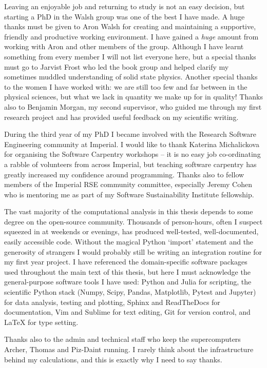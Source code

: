 Leaving an enjoyable job and returning to study is not an easy decision, but starting a PhD in the Walsh group was one of the best I have made. A huge thanks must be given to Aron Walsh for creating and maintaining a supportive, friendly and productive working environment. I have gained a \textit{huge} amount from working with Aron and other members of the group. Although I have learnt something from every member I will not list everyone here, but a special thanks must go to Jarvist Frost who led the book group and helped clarify my sometimes muddled understanding of solid state physics. Another special thanks to the women I have worked with: we are still too few and far between in the physical sciences, but what we lack in quantity we make up for in quality! Thanks also to Benjamin Morgan, my second supervisor, who guided me through my first research project and has provided useful feedback on my scientific writing. 

During the third year of my PhD I became involved with the Research Software Engineering community at Imperial. I would like to thank Katerina Michalickova for organising the Software Carpentry workshops -- it is no easy job co-ordinating a rabble of volunteers from across Imperial, but teaching software carpentry has greatly increased my confidence around programming. Thanks also to fellow members of the Imperial RSE community committee, especially Jeremy Cohen who is mentoring me as part of my Software Sustainability Institute fellowship.

The vast majority of the computational analysis in this thesis depends to some degree on the open-source community. Thousands of person-hours, often I suspect squeezed in at weekends or evenings, has produced well-tested, well-documented, easily accessible code. Without the magical Python `import' statement and the generosity of strangers I would probably still be writing an integration routine for my first year project. I have referenced the domain-specific software packages used throughout the main text of this thesis, but here I must acknowledge the general-purpose software tools I have used: Python and Julia for scripting, the scientific Python stack (Numpy, Scipy, Pandas, Matplotlib, Pytest and Jupyter) for data analysis, testing and plotting, Sphinx and ReadTheDocs for documentation, Vim and Sublime for text editing, Git for version control, and LaTeX for type setting.

Thanks also to the admin and technical staff who keep the supercomputers Archer, Thomas and Piz-Daint running. I rarely think about the infrastructure behind my calculations, and this is exactly why I need to say thanks.

